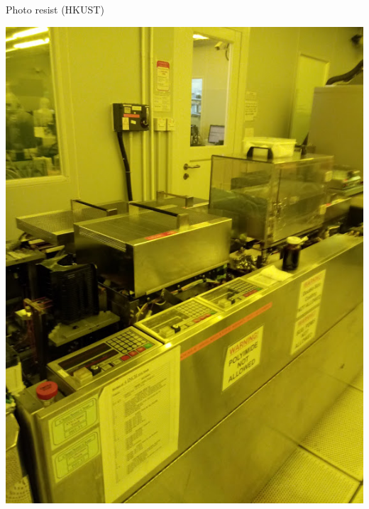 \documentclass[aspectratio=169]{beamer}
\begin{document}
\begin{frame}{Photo resist (HKUST)}
	\begin{center}
		\includegraphics[height=0.8\textheight]{images/20181128_154907.jpg}

\end{center}
\end{frame}
\end{document}
